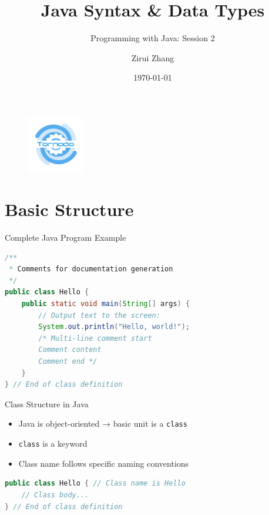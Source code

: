 \documentclass[serif, aspectratio=169]{beamer}
\author{Zirui Zhang}
\title{Java Syntax \& Data Types}
\subtitle{Programming with Java: Session 2}
\institute{
    Tornado Engineering Club \\
    Jinan Foreign Language School
}
\date{\small \today}
\begin{document}
\begin{frame}
    \titlepage
    \vspace*{-0.4cm} %
    \begin{figure}[htpb]
        \begin{center}
            \includegraphics[keepaspectratio, width=2.5cm]{pic/tornado.png}
        \end{center}
    \end{figure}
    \vspace{-1.5em}
\end{frame}

\begin{frame}    
\tableofcontents[sectionstyle=show,
subsectionstyle=show/shaded/hide,
subsubsectionstyle=show/shaded/hide]
\end{frame}

\section{Basic Structure}
\begin{frame}[fragile]{Complete Java Program Example}
\begin{lstlisting}[language=Java]
/**
 * Comments for documentation generation
 */
public class Hello {
    public static void main(String[] args) {
        // Output text to the screen:
        System.out.println("Hello, world!");
        /* Multi-line comment start
        Comment content
        Comment end */
    }
} // End of class definition
\end{lstlisting}
\end{frame}

\begin{frame}[fragile]{Class Structure in Java}
\begin{itemize}
    \item Java is object-oriented → basic unit is a \texttt{class}
    \item \texttt{class} is a keyword
    \item Class name follows specific naming conventions
\end{itemize}

\begin{lstlisting}[language=Java]
public class Hello { // Class name is Hello
    // Class body...
} // End of class definition
\end{lstlisting}
\end{frame}
\end{document}
